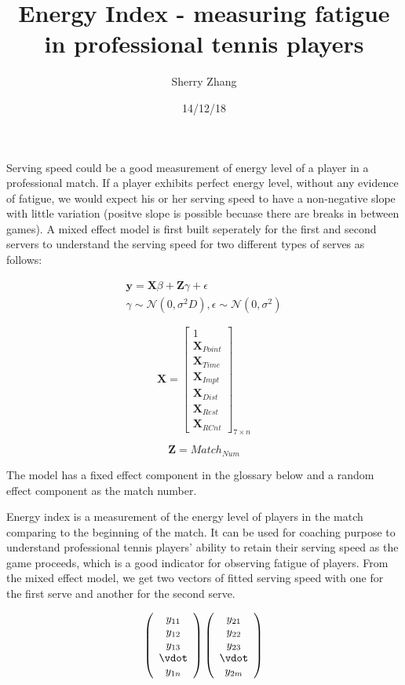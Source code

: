 \documentclass[12pt]{article}
\title{Energy Index - measuring fatigue in professional tennis players}
\author{Sherry Zhang}
\date{14/12/18}
\begin{document}
\maketitle

Serving speed could be a good measurement of energy level of a player in a professional match. If a player exhibits perfect energy level, without any evidence of fatigue, we would expect his or her serving speed to have a non-negative slope with little variation (positve slope is possible becuase there are breaks in between games). A mixed effect model is first built seperately for the first and second servers to understand the serving speed for two different types of serves as follows:

\begin{multline}
\symbf{y} = \symbf{X}\beta + \symbf{Z}\gamma + \epsilon \\
\gamma \sim \mathcal{N}(0, \sigma^2D), \epsilon \sim \mathcal{N}(0, \sigma^2)
\end{multline}

\begin{equation}
\symbf{X} = 
  \begin{bmatrix}
   1 \\ \symbf{X}_{Point} \\\symbf{X}_{Time} \\ \symbf{X}_{Impt} \\\symbf{X}_{Dist} \\\symbf{X}_{Rest} \\\symbf{X}_{RCnt}
  \end{bmatrix}_{7 \times n}
\end{equation}

\begin{equation}
  \symbf{Z} = Match_{Num}
\end{equation}

The model has a fixed effect component in the glossary below and a random effect component as the match number. 

Energy index is a measurement of the energy level of players in the match comparing to the beginning of the match. It can be used for coaching purpose to understand professional tennis players' ability to retain their serving speed as the game proceeds, which is a good indicator for observing fatigue of players. From the mixed effect model, we get two vectors of fitted serving speed with one  for the first serve and another for the second serve.  


\begin{equation*}
\left( \begin{array}{ccccc}
    y_{11}  \\ y_{12} \\ y_{13}  \\ \vdot \\ y_{1n} 
\end{array} \right)
\left( \begin{array}{ccccc}
   y_{21} \\  y_{22} \\ y_{23} \\ \vdot \\ y_{2m}
\end{array} \right)
\end{equation*}
 
\end{document}
